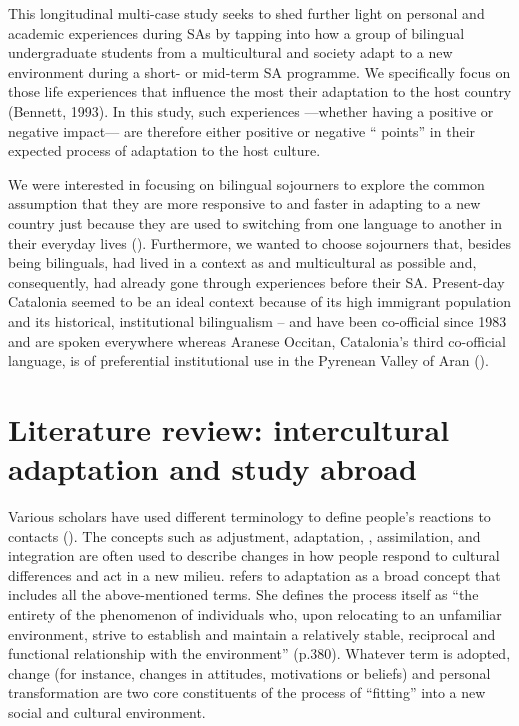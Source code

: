 \documentclass[output=paper]{langsci/langscibook}
\begin{document}
This longitudinal multi-case study seeks to shed further light on personal and academic experiences during SAs by tapping into how a group of bilingual undergraduate students from a multicultural and  society adapt to a new environment during a short- or mid-term SA programme.   We specifically focus on those life experiences that influence the most their adaptation to the host country (Bennett, 1993). In this study, such experiences —whether having a positive or negative impact— are therefore either positive or negative “ points” in their expected process of adaptation to the host culture.

We were interested in focusing on bilingual sojourners to explore the common assumption that they are more responsive to and faster in adapting to a new country just because they are used to switching from one language to another in their everyday lives (\citealt{Bialystok2001,VedderVirta2005}). Furthermore, we wanted to choose sojourners that, besides being bilinguals, had lived in a context as  and multicultural as possible and, consequently, had already gone through  experiences before their SA. Present-day Catalonia seemed to be an ideal context because of its high immigrant population and its historical, institutional bilingualism –  and  have been co-official since 1983 and are spoken everywhere whereas Aranese Occitan, Catalonia’s third co-official language, is of preferential institutional use in the Pyrenean Valley of Aran (\citealt{NewmanEtAl2008,Trenchs-PareraNewman2015}).


\section{Literature review: intercultural adaptation and study abroad}\label{sec:pogorelova:2}

Various scholars have used different terminology to define people’s reactions to  contacts (\citealt{Berry1997,Ward2004,MasgoretWard2006}). The concepts such as adjustment, adaptation, , assimilation, and integration are often used to describe changes in how people respond to cultural differences and act in a new milieu. \citet{Kim2005} refers to adaptation as a broad concept that includes all the above-mentioned terms. She defines the process itself as “the entirety of the phenomenon of individuals who, upon relocating to an unfamiliar  environment, strive to establish and maintain a relatively stable, reciprocal and functional relationship with the environment” (p.380). Whatever term is adopted, change (for instance, changes in attitudes, motivations or beliefs) and personal transformation are two core constituents of the process of “fitting” into a new social and cultural environment.
\end{document}
